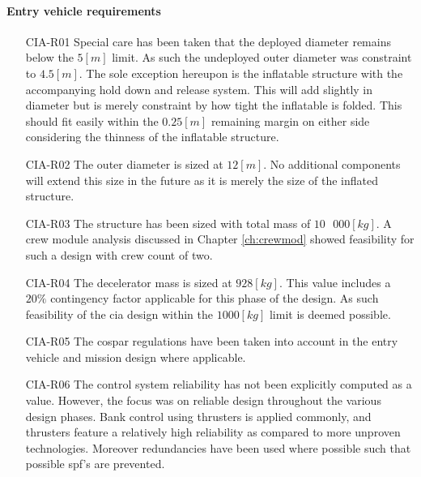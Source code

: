 \paragraph{Entry vehicle requirements}
\begin{itemize}[leftmargin=+20mm]
\item[CIA-R01] Special care has been taken that the deployed diameter remains below the $5 \left[m\right]$ limit. As such the undeployed outer diameter was constraint to $4.5 \left[m\right]$. The sole exception hereupon is the inflatable structure with the accompanying hold down and release system. This will add slightly in diameter but is merely constraint by how tight the inflatable is folded. This should fit easily within the $0.25 \left[m\right]$ remaining margin on either side considering the thinness of the inflatable structure. 
\item[CIA-R02] The outer diameter is sized at $12 \left[m\right]$. No additional components will extend this size in the future as it is merely the size of the inflated structure.
\item[CIA-R03] The structure has been sized with total mass of $10\mbox{ }000 \left[kg\right]$. A crew module analysis discussed in Chapter \ref{ch:crewmod} showed feasibility for such a design with crew count of two.
\item[CIA-R04] The decelerator mass is sized at $928 \left[kg\right]$. This value includes a $20\%$ contingency factor applicable for this phase of the design. As such feasibility of the \gls{cia} design within the $1000 \left[kg\right]$ limit is deemed possible.
\item[CIA-R05] The \gls{cospar} regulations have been taken into account in the entry vehicle and mission design where applicable.
\item[CIA-R06] The control system reliability has not been explicitly computed as a value. However, the focus was on reliable design throughout the various design phases. Bank control using thrusters is applied commonly, and thrusters feature a relatively high reliability as compared to more unproven technologies. Moreover redundancies have been used where possible such that possible \gls{spf}'s are prevented. 
\end{itemize}


